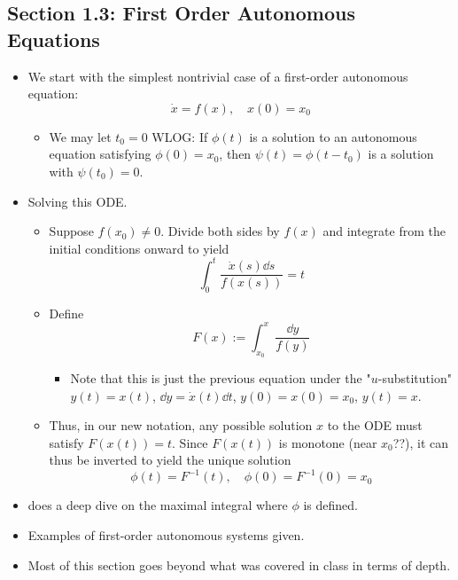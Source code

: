 \documentclass[../notes.tex]{subfiles}
\begin{document}
\subsection*{Section 1.3: First Order Autonomous Equations}
\begin{itemize}
    \item {}We start with the simplest nontrivial case of a first-order autonomous equation:
    \begin{equation*}
        \dot{x} = f(x)
        ,\quad
        x(0) = x_0
    \end{equation*}
    \begin{itemize}
        \item We may let $t_0=0$ WLOG: If $\phi(t)$ is a solution to an autonomous equation satisfying $\phi(0)=x_0$, then $\psi(t)=\phi(t-t_0)$ is a solution with $\psi(t_0)=0$.
    \end{itemize}
    \item Solving this ODE.
    \begin{itemize}
        \item Suppose $f(x_0)\neq 0$. Divide both sides by $f(x)$ and integrate from the initial conditions onward to yield
        \begin{equation*}
            \int_0^t\frac{\dot{x}(s)\dd{s}}{f(x(s))} = t
        \end{equation*}
        \item Define
        \begin{equation*}
            F(x) := \int_{x_0}^x\frac{\dd{y}}{f(y)}
        \end{equation*}
        \begin{itemize}
            \item Note that this is just the previous equation under the "$u$-substitution" $y(t)=x(t)$, $\dd{y}=\dot{x}(t)\dd{t}$, $y(0)=x(0)=x_0$, $y(t)=x$.
        \end{itemize}
        \item Thus, in our new notation, any possible solution $x$ to the ODE must satisfy $F(x(t))=t$. Since $F(x(t))$ is monotone (near $x_0$??), it can thus be inverted to yield the unique solution
        \begin{equation*}
            \phi(t) = F^{-1}(t)
            ,\quad
            \phi(0) = F^{-1}(0) = x_0
        \end{equation*}
    \end{itemize}
    \item \textcite{bib:Teschl} does a deep dive on the maximal integral where $\phi$ is defined.
    \item Examples of first-order autonomous systems given.
    \item Most of this section goes beyond what was covered in class in terms of depth.
\end{itemize}
\end{document}
